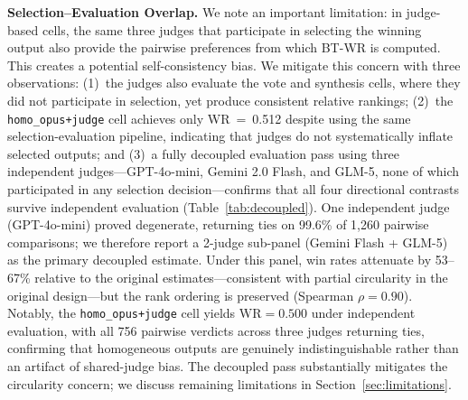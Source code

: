 \documentclass[10pt,twocolumn]{article}
\theoremstyle{remark}
\begin{document}
\textbf{Selection--Evaluation Overlap.}
We note an important limitation: in judge-based cells, the same three judges that participate in selecting the winning output also provide the pairwise preferences from which BT-WR is computed. This creates a potential self-consistency bias. We mitigate this concern with three observations: (1)~the judges also evaluate the vote and synthesis cells, where they did not participate in selection, yet produce consistent relative rankings; (2)~the \texttt{homo\_opus+judge} cell achieves only WR~=~0.512 despite using the same selection-evaluation pipeline, indicating that judges do not systematically inflate selected outputs; and (3)~a fully decoupled evaluation pass using three independent judges---GPT-4o-mini, Gemini 2.0 Flash, and GLM-5, none of which participated in any selection decision---confirms that all four directional contrasts survive independent evaluation (Table~\ref{tab:decoupled}). One independent judge (GPT-4o-mini) proved degenerate, returning ties on 99.6\% of 1,260 pairwise comparisons; we therefore report a 2-judge sub-panel (Gemini Flash + GLM-5) as the primary decoupled estimate. Under this panel, win rates attenuate by 53--67\% relative to the original estimates---consistent with partial circularity in the original design---but the rank ordering is preserved (Spearman $\rho = 0.90$). Notably, the \texttt{homo\_opus+judge} cell yields $\mathrm{WR} = 0.500$ under independent evaluation, with all 756 pairwise verdicts across three judges returning ties, confirming that homogeneous outputs are genuinely indistinguishable rather than an artifact of shared-judge bias. The decoupled pass substantially mitigates the circularity concern; we discuss remaining limitations in Section~\ref{sec:limitations}.

\begin{table}[t]
  \centering
  \caption{Original vs.\ decoupled win rates. Decoupled WR uses an independent 2-judge panel (Gemini 2.0 Flash + GLM-5); 3-judge panel values (including degenerate GPT-4o-mini, 99.6\% tie rate) shown for completeness. All directional contrasts survive; Spearman $\rho = 0.90$ (2-judge panel).}
  \label{tab:decoupled}
\end{table}
\end{document}
